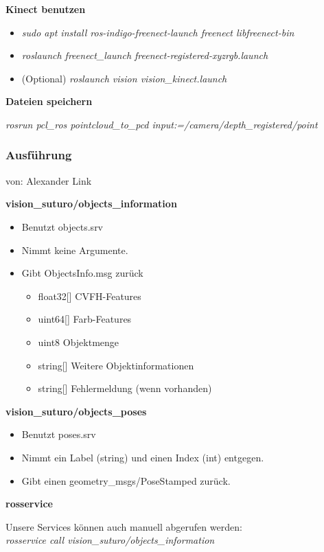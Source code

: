 \documentclass{suturo}
\makeatletter
\newcommand{\chapterauthor}[1]{%
  {\parindent0pt\vspace*{-27pt}%
  \linespread{0}\small\begin{flushright}von: #1\end{flushright}%
  \par\nobreak\vspace*{0pt}}
  \@afterheading%
}
\makeatother
\begin{document}
\textbf{Kinect benutzen}
\begin{itemize}
\item \textit{sudo apt install ros-indigo-freenect-launch freenect libfreenect-bin}
\item \textit{roslaunch freenect\_launch freenect-registered-xyzrgb.launch}
\item (Optional) \textit{roslaunch vision vision\_kinect.launch}
\end{itemize}

\textbf{Dateien speichern}

    \textit{rosrun pcl\_ros pointcloud\_to\_pcd input:=/camera/depth\_registered/point}


\subsubsection{Ausf\"uhrung}
\chapterauthor{Alexander Link}

\textbf{vision\_suturo/objects\_information}
\begin{itemize}
\item Benutzt objects.srv
\item Nimmt keine Argumente.
\item Gibt ObjectsInfo.msg zurück
\begin{itemize}
\item float32[] CVFH-Features
\item uint64[] Farb-Features
\item uint8 Objektmenge
\item string[] Weitere Objektinformationen
\item string[] Fehlermeldung (wenn vorhanden)
\end{itemize}
\end{itemize}
\textbf{vision\_suturo/objects\_poses}
\begin{itemize}
\item Benutzt poses.srv
\item Nimmt ein Label (string) und einen Index (int) entgegen.
\item Gibt einen geometry\_msgs/PoseStamped zurück.
\end{itemize}

\textbf{rosservice}

Unsere Services k\"onnen auch manuell abgerufen werden: \\

\textit{rosservice call vision\_suturo/objects\_information} \\
\end{document}
